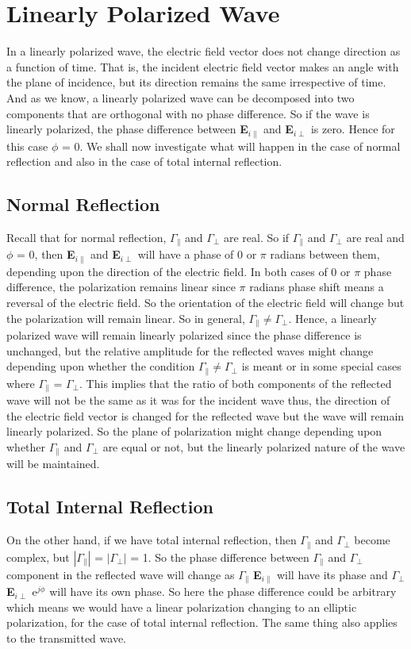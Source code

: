 \section{Linearly Polarized Wave}
In a linearly polarized wave, the electric field vector does not change direction as a function of time. That is, the incident electric field vector makes an angle with the plane of incidence, but its direction remains the same irrespective of time. And as we know, a linearly polarized wave can be decomposed into two components that are orthogonal with no phase difference. So if the wave is linearly polarized, the phase difference between \textbf{E}$_{i\parallel}$ and \textbf{E}$_{i\perp}$ is zero. Hence for this case $\phi$ = 0. We shall now investigate what will happen in the case of normal reflection and also in the case of total internal reflection.

\subsection{Normal Reflection}
Recall that for normal reflection, $\Gamma_\parallel$ and $\Gamma_\perp$ are real. So if $\Gamma_\parallel$ and $\Gamma_\perp$ are real and $\phi$ = 0, then \textbf{E}$_{i\parallel}$ and \textbf{E}$_{i\perp}$ will have a phase of $0$ or $\pi$ radians between them, depending upon the direction of the electric field. In both cases of 0 or $\pi$ phase difference, the polarization remains linear since $\pi$ radians phase shift means a reversal of the electric field. So the orientation of the electric field will change but the polarization will remain linear. So in general, $\Gamma_\parallel \neq \Gamma_\perp$. Hence, a linearly polarized wave will remain linearly polarized since the phase difference is unchanged, but the relative amplitude for the reflected waves might change depending upon whether the condition $\Gamma_\parallel \neq \Gamma_\perp$ is meant or in some special cases where $\Gamma_\parallel$ = $\Gamma_\perp$. This implies that the ratio of both components of the reflected wave will not be the same as it was for the incident wave thus, the direction of the electric field vector is changed for the reflected wave but the wave will remain linearly polarized. So the plane of polarization might change depending upon whether $\Gamma_\parallel$ and $\Gamma_\perp$ are equal or not, but the linearly polarized nature of the wave will be maintained.

\subsection{Total Internal Reflection}
On the other hand, if we have total internal reflection, then $\Gamma_\parallel$ and $\Gamma_\perp$ become complex, but $|\Gamma_\parallel|$ = $|\Gamma_\perp|$ = 1. So the phase difference between $\Gamma_\parallel$ and $\Gamma_\perp$ component in the reflected wave will change as $\Gamma_\parallel$ \textbf{E}$_{i\parallel}$ will have its phase and $\Gamma_\perp$ \textbf{E}$_{i\perp}$ e$^{j\phi}$ will have its own phase. So here the phase difference could be arbitrary which means we would have a linear polarization changing to an elliptic polarization, for the case of total internal reflection. The same thing also applies to the transmitted wave. 

